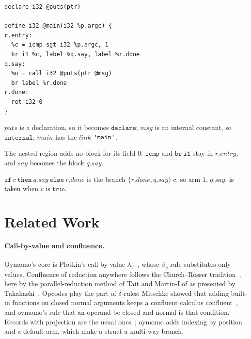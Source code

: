 \documentclass[11pt,letterpaper]{article}
\newcommand{\kw}[1]{\mathtt{#1}}
\newcommand{\str}[1]{\text{\ttfamily\textquotesingle #1\textquotesingle}}  %
\newcounter{pt}
\begin{document}
\begin{points}
\begin{Verbatim}[xleftmargin=2em]
declare i32 @puts(ptr)

define i32 @main(i32 %p.argc) {
r.entry:
  %c = icmp sgt i32 %p.argc, 1
  br i1 %c, label %q.say, label %r.done
q.say:
  %u = call i32 @puts(ptr @msg)
  br label %r.done
r.done:
  ret i32 0
}
\end{Verbatim}
  \begin{subpoints}
  \item $\mathit{puts}$ is a declaration, so it becomes $\kw{declare}$; $\mathit{msg}$ is an internal constant, so
    $\kw{internal}$; $\mathit{main}$ has the $\mathit{link}$ $\str{main}$.
  \item The nested region adds no block for its field $0$: $\kw{icmp}$ and $\kw{br\ i1}$ stay in $r.\mathit{entry}$, and $\mathit{say}$
    becomes the block $q.\mathit{say}$.
  \item $\kw{if}\ c\ \kw{then}\ q.\mathit{say}\ \kw{else}\ r.\mathit{done}$ is the branch $\{r.\mathit{done}, q.\mathit{say}\}\ c$, so arm $1$, $q.\mathit{say}$, is
    taken when $c$ is true.
  \end{subpoints}
\end{points}


\section{Related Work}\label{sec:related}

\paragraph{Call-by-value and confluence.}
Oymomo's core is Plotkin's call-by-value $\lambda_v$~\cite{plotkin1975}, whose
$\beta_v$ rule substitutes only values. Confluence of reduction anywhere
follows the Church--Rosser tradition~\cite{churchrosser1936}, here by the
parallel-reduction method of Tait and Martin-L\"of as presented by
Takahashi~\cite{takahashi1995}. Opcodes play the part of $\delta$-rules:
Mitschke showed that adding built-in functions on closed normal arguments keeps
a confluent calculus confluent~\cite{barendregt1984}, and oymomo's rule that an
operand be closed and normal is that condition. Records with projection are the
usual ones~\cite{pierce2002}; oymomo adds indexing by position and a default
arm, which make a struct a multi-way branch.
\end{document}
